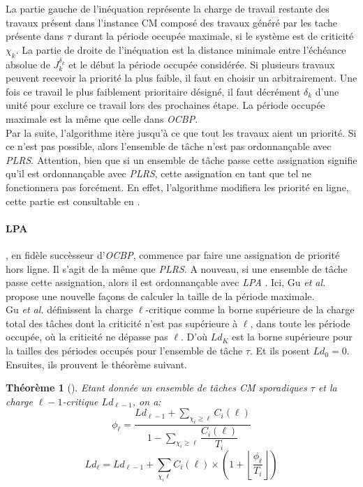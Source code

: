 \documentclass[12pt,a4paper,oneside]{book}
\theoremstyle{break}
\theoremstyle{breakplain}
\newtheorem{theo}{Théorème}[chapter]
\begin{document}
La partie gauche de l'inéquation représente la charge de travail restante des travaux présent dans l'instance CM composé des travaux généré par les tache présente dans $\tau$ durant la période occupée maximale, si le système est de criticité $\chi_k$. La partie de droite de l'inéquation est la distance minimale entre l'échéance absolue de $J^{\delta_k}_k$ et le début la période occupée considérée. Si plusieurs travaux peuvent recevoir la priorité la plus faible, il faut en choisir un arbitrairement. Une fois ce travail le plus faiblement prioritaire désigné, il faut décrément $\delta_k$ d'une unité pour exclure ce travail lors des prochaines étape. La période occupée maximale est la même que celle dans \textit{OCBP}.\\
Par la suite, l'algorithme itère jusqu'à ce que tout les travaux aient un priorité. Si ce n'est pas possible, alors l'ensemble de tâche n'est pas ordonnançable avec \textit{PLRS}. Attention, bien que si un ensemble de tâche passe cette assignation signifie qu'il est ordonnançable avec \textit{PLRS}, cette assignation en tant que tel ne fonctionnera pas forcément. En effet, l'algorithme modifiera les priorité en ligne, cette partie est consultable en \cite{guan2011effective}.


\paragraph{LPA} , en fidèle succèsseur d'\textit{OCBP}, commence par faire une assignation de priorité hors ligne. Il s'agit de la même que \textit{PLRS}. A nouveau, si une ensemble de tâche passe cette assignation, alors il est ordonnançable avec \textit{LPA} \cite{gu2013improving}. Ici, Gu \textit{et al.} propose une nouvelle façons de calculer la taille de la période maximale.\\

Gu \textit{et al.} définissent la charge $\ell$-critique comme la borne supérieure de la charge total des tâches dont la criticité n'est pas supérieure à $\ell$, dans toute les période occupée, où la criticité ne dépasse pas $\ell$. D'où $Ld_K$ est la borne supérieure pour la tailles des périodes occupés pour l'ensemble de tâche $\tau$. Et ils posent $Ld_0 = 0$.\\

Ensuites, ils prouvent le théorème suivant.

\begin{theo}[\cite{gu2013improving}]
Etant donnée un ensemble de tâches CM sporadiques $\tau$ et la charge $\ell-1$-critique $Ld_{\ell-1}$, on a:
\begin{equation}
\phi_\ell = \dfrac{Ld_{\ell-1} + \sum_{\chi_i \ge \ell} C_i(\ell)}{1 - \sum_{\chi_i \ge \ell} \dfrac{C_i(\ell)}{T_i}}
\end{equation}
\begin{equation}
Ld_\ell = Ld_{\ell-1} + \underset{\chi_i \ell}{\sum}C_i(\ell) \times \left( 1 + \left\lfloor \dfrac{\phi_\ell}{T_i} \right\rfloor \right)
\end{equation}
\end{theo}
\end{document}
